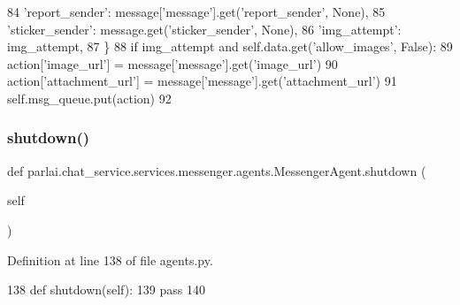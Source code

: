 \begin{DoxyCode}
84                 \textcolor{stringliteral}{'report\_sender'}: message[\textcolor{stringliteral}{'message'}].get(\textcolor{stringliteral}{'report\_sender'}, \textcolor{keywordtype}{None}),
85                 \textcolor{stringliteral}{'sticker\_sender'}: message.get(\textcolor{stringliteral}{'sticker\_sender'}, \textcolor{keywordtype}{None}),
86                 \textcolor{stringliteral}{'img\_attempt'}: img\_attempt,
87             \}
88             \textcolor{keywordflow}{if} img\_attempt \textcolor{keywordflow}{and} self.data.get(\textcolor{stringliteral}{'allow\_images'}, \textcolor{keyword}{False}):
89                 action[\textcolor{stringliteral}{'image\_url'}] = message[\textcolor{stringliteral}{'message'}].get(\textcolor{stringliteral}{'image\_url'})
90                 action[\textcolor{stringliteral}{'attachment\_url'}] = message[\textcolor{stringliteral}{'message'}].get(\textcolor{stringliteral}{'attachment\_url'})
91             self.msg\_queue.put(action)
92 
\end{DoxyCode}
\mbox{\label{classparlai_1_1chat__service_1_1services_1_1messenger_1_1agents_1_1MessengerAgent_a84f14647eaa8536cad36813d02206949}} 
\subsubsection{\texorpdfstring{shutdown()}{shutdown()}}
{\footnotesize\ttfamily def parlai.\+chat\+\_\+service.\+services.\+messenger.\+agents.\+Messenger\+Agent.\+shutdown (\begin{DoxyParamCaption}\item[{}]{self }\end{DoxyParamCaption})}



Definition at line 138 of file agents.\+py.


\begin{DoxyCode}
138     \textcolor{keyword}{def }shutdown(self):
139         \textcolor{keywordflow}{pass}
140 \end{DoxyCode}


